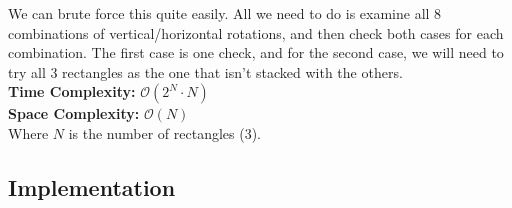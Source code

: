 We can brute force this quite easily. All we need to do is examine all
8 combinations of vertical/horizontal rotations, and then check both cases for
each combination. The first case is one check, and for the second case, we will
need to try all 3 rectangles as the one that isn't stacked with the others.\\

\hfill\break
\textbf{Time Complexity:} $\mathcal{O}(2^{N} \cdot N)$\\
\textbf{Space Complexity:} $\mathcal{O}(N)$\\
Where $N$ is the number of rectangles (3).
\pagebreak
\subsection{Implementation}

\pagebreak

\pagebreak
